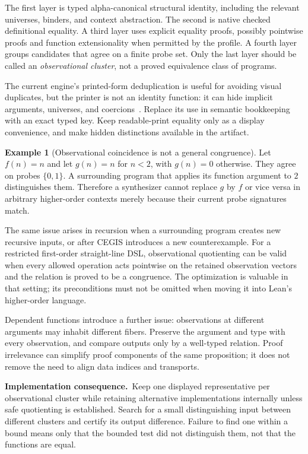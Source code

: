 \documentclass[11pt,a4paper]{article}
\theoremstyle{definition}
\newtheorem{example}[proposition]{Example}
\theoremstyle{remark}
\newcommand{\imp}{\par\noindent\textbf{Implementation consequence.}\ }
\begin{document}
The first layer is typed alpha-canonical structural identity, including the
relevant universes, binders, and context abstraction. The second is native
checked definitional equality. A third layer uses explicit equality proofs,
possibly pointwise proofs and function extensionality when permitted by the
profile. A fourth layer groups candidates that agree on a finite probe set.
Only the last layer should be called an \emph{observational cluster}, not a
proved equivalence class of programs.

The current engine's printed-form deduplication is useful for avoiding visual
duplicates, but the printer is not an identity function: it can hide implicit
arguments, universes, and coercions~\cite{implementation}. Replace its use in
semantic bookkeeping with an exact typed key. Keep readable-print equality
only as a display convenience, and make hidden distinctions available in the
artifact.

\begin{example}[Observational coincidence is not a general congruence]
Let $f(n)=n$ and let $g(n)=n$ for $n<2$, with $g(n)=0$ otherwise. They agree on
probes $\{0,1\}$. A surrounding program that applies its function argument to
$2$ distinguishes them. Therefore a synthesizer cannot replace $g$ by $f$ or
vice versa in arbitrary higher-order contexts merely because their current
probe signatures match.
\end{example}

The same issue arises in recursion when a surrounding program creates new
recursive inputs, or after CEGIS introduces a new counterexample. For a
restricted first-order straight-line DSL, observational quotienting can be
valid when every allowed operation acts pointwise on the retained observation
vectors and the relation is proved to be a congruence. The optimization is
valuable in that setting; its preconditions must not be omitted when moving
it into Lean's higher-order language.

Dependent functions introduce a further issue: observations at different
arguments may inhabit different fibers. Preserve the argument and type with
every observation, and compare outputs only by a well-typed relation. Proof
irrelevance can simplify proof components of the same proposition; it does not
remove the need to align data indices and transports.

\imp Keep one displayed representative per observational cluster while
retaining alternative implementations internally unless safe quotienting is
established. Search for a small distinguishing input between different
clusters and certify its output difference. Failure to find one within a bound
means only that the bounded test did not distinguish them, not that the
functions are equal.
\end{document}
